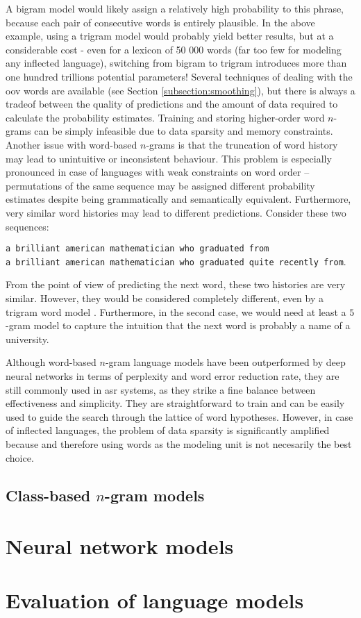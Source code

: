 A bigram model would likely assign a relatively high probability to this phrase, because each pair of consecutive words is entirely plausible. 
In the above example, using a trigram model would probably yield better results, but at a considerable cost - even for a lexicon of 50 000 words (far too few for modeling any inflected language), switching from bigram to trigram introduces more than one hundred trillions potential parameters! Several techniques of dealing with the \gls{oov} words are available (see Section \ref{subsection:smoothing}), but there is always a tradeof between the quality of predictions and the amount of data required to calculate the probability estimates. Training and storing higher-order word $n$-grams can be simply infeasible due to data sparsity and memory constraints.
Another issue with word-based $n$-grams is that the truncation of word history may lead to unintuitive or inconsistent behaviour. This problem is especially pronounced in case of languages with weak constraints on word order -- permutations of the same sequence may be assigned different probability estimates despite being grammatically and semantically equivalent. Furthermore, very similar word histories may lead to different predictions. Consider these two sequences:
\begin{center}
	\texttt{a brilliant american mathematician who graduated from} \\
	\texttt{a brilliant american mathematician who graduated quite recently from}.
\end{center}
From the point of view of predicting the next word, these two histories are very similar. However, they would be considered completely different, even by a trigram word model \cite{whittaker2000statistical}. Furthermore, in the second case, we would need at least a $5$-gram model to capture the intuition that the next word is probably a name of a university.

Although word-based $n$-gram language models have been outperformed by deep neural networks in terms of perplexity and word error reduction rate, they are still commonly used in \gls{asr} systems, as they strike a fine balance between effectiveness and simplicity. They are straightforward to train and can be easily used to guide the search through the lattice of word hypotheses. However, in case of inflected languages, the problem of data sparsity is significantly amplified because and therefore using words as the modeling unit is not necesarily the best choice.
\subsection{Class-based $n$-gram models}
\section{Neural network models}
\label{section:ann}
\section{Evaluation of language models}
\label{section:evaluation}
